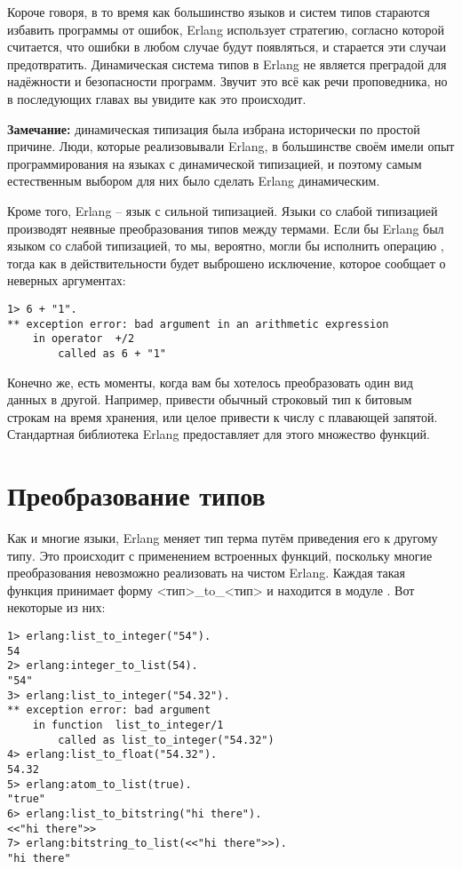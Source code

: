 Короче говоря, в то время как большинство языков и систем типов стараются избавить программы от ошибок, Erlang использует стратегию, согласно которой считается, что ошибки в любом случае будут появляться, и старается эти случаи предотвратить. Динамическая система типов в Erlang не является преградой для надёжности и безопасности программ. Звучит это всё как речи проповедника, но в последующих главах вы увидите как это происходит.\\
\colorbox{lgray}
{
    \begin{minipage}{\linewidth}
\textbf{Замечание:} динамическая типизация была избрана исторически по простой причине. Люди, которые реализовывали Erlang, в большинстве своём имели опыт программирования на языках с динамической типизацией, и поэтому самым естественным выбором для них было сделать Erlang динамическим.
    \end{minipage}
}

Кроме того, Erlang \--- язык с сильной типизацией. Языки со слабой типизацией производят неявные преобразования типов между термами. Если бы Erlang был языком со слабой типизацией, то мы, вероятно, могли бы исполнить операцию , тогда как в действительности будет выброшено исключение, которое сообщает о неверных аргументах:
\begin{lstlisting}[style=erlang]
1> 6 + "1".
** exception error: bad argument in an arithmetic expression
    in operator  +/2
        called as 6 + "1"
\end{lstlisting}

Конечно же, есть моменты, когда вам бы хотелось преобразовать один вид данных в другой. Например, привести обычный строковый тип к битовым строкам на время хранения, или целое привести к числу с плавающей запятой. Стандартная библиотека Erlang предоставляет для этого множество функций.
\section{Преобразование типов}
Как и многие языки, Erlang меняет тип терма путём приведения его к другому типу. Это происходит с применением встроенных функций, поскольку многие преобразования невозможно реализовать на чистом Erlang. Каждая такая функция принимает форму <тип>\_to\_<тип> и находится в модуле . Вот некоторые из них:
\begin{lstlisting}[style=erlang]
1> erlang:list_to_integer("54").
54
2> erlang:integer_to_list(54).
"54"
3> erlang:list_to_integer("54.32").
** exception error: bad argument
    in function  list_to_integer/1
        called as list_to_integer("54.32")
4> erlang:list_to_float("54.32").
54.32
5> erlang:atom_to_list(true).
"true"
6> erlang:list_to_bitstring("hi there").
<<"hi there">>
7> erlang:bitstring_to_list(<<"hi there">>).
"hi there"
\end{lstlisting}

